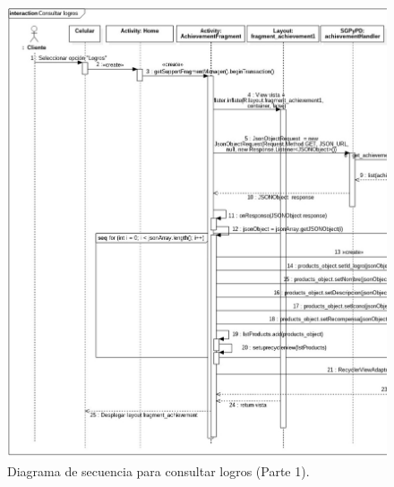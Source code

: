\FloatBarrier
\begin{figure}[htbp!]
		\centering
			\includegraphics[width=.9 \textwidth]{imagenes/Diagramas_UserApp/Nuevos_diagramas/Logros1}
		\caption{Diagrama de secuencia para consultar logros (Parte 1).}
		\label{image:DSConsultarLogros2}
\end{figure}
\FloatBarrier

